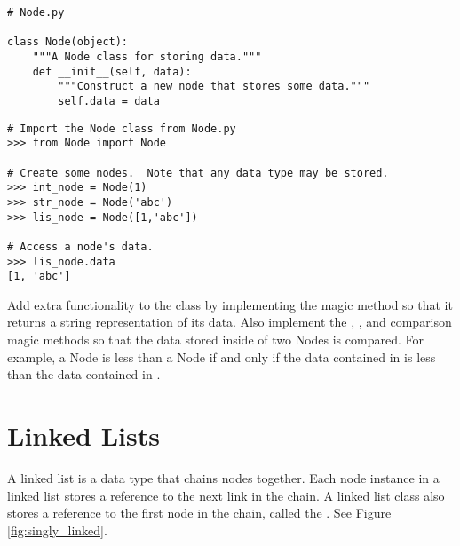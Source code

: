 \begin{lstlisting}
# Node.py

class Node(object):
	"""A Node class for storing data."""
	def __init__(self, data):
		"""Construct a new node that stores some data."""
		self.data = data
\end{lstlisting}

\begin{lstlisting}
# Import the Node class from Node.py
>>> from Node import Node

# Create some nodes.  Note that any data type may be stored.
>>> int_node = Node(1)
>>> str_node = Node('abc')
>>> lis_node = Node([1,'abc'])

# Access a node's data.
>>> lis_node.data
[1, 'abc']
\end{lstlisting}

\begin{problem}
Add extra functionality to the  class by implementing the  magic method so that it returns a string representation of its data.
Also implement the , , and  comparison magic methods so that the data stored inside of two Nodes is compared.
For example, a Node  is less than a Node  if and only if the data contained in  is less than the data contained in .
\end{problem}

\begin{comment}
\begin{problem}
Add a new class to \li{Node.py} called \li{StrNode} that only accepts strings as data.
Use inheritance and call the \li{Node} class constructor in the constructor for \li{StrNode}
(Hint: Use the \li{type} built-in function).

Implement the \li{__str__} magic method in the \li{Node} class so that it returns a string representation of its data.
\end{problem}
\end{comment}

\section*{Linked Lists}

A linked list is a data type that chains nodes together.
Each node instance in a linked list stores a reference to the next link in the chain.
A linked list class also stores a reference to the first node in the chain, called the .
See Figure \ref{fig:singly_linked}.

